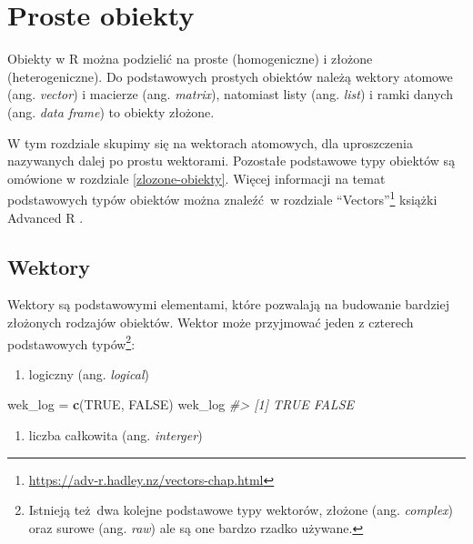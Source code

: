 \documentclass[paper=6in:9in,pagesize=pdftex,headinclude=on,footinclude=on,10pt]{scrbook}
\newenvironment{Shaded}{\begin{snugshade}}{\end{snugshade}}
\newcommand{\CommentTok}[1]{\textcolor[rgb]{0.56,0.35,0.01}{\textit{#1}}}
\newcommand{\KeywordTok}[1]{\textcolor[rgb]{0.13,0.29,0.53}{\textbf{#1}}}
\newcommand{\NormalTok}[1]{#1}
\newcommand{\OtherTok}[1]{\textcolor[rgb]{0.56,0.35,0.01}{#1}}
\newcommand{\StringTok}[1]{\textcolor[rgb]{0.31,0.60,0.02}{#1}}
\DeclareRobustCommand{\href}[2]{#2\footnote{\url{#1}}}
\providecommand{\tightlist}{%
  \setlength{\itemsep}{0pt}\setlength{\parskip}{0pt}}
\begin{document}
\hypertarget{proste-obiekty}{%
\chapter{Proste obiekty}\label{proste-obiekty}}

Obiekty w R można podzielić na proste (homogeniczne) i złożone (heterogeniczne).
Do podstawowych prostych obiektów należą wektory atomowe (ang. \emph{vector}) i macierze (ang. \emph{matrix}), natomiast listy (ang. \emph{list}) i ramki danych (ang. \emph{data frame}) to obiekty złożone.

W tym rozdziale skupimy się na wektorach atomowych, dla uproszczenia nazywanych dalej po prostu wektorami.
Pozostałe podstawowe typy obiektów są omówione w rozdziale \ref{zlozone-obiekty}.
Więcej informacji na temat podstawowych typów obiektów można znaleźć~w rozdziale \href{https://adv-r.hadley.nz/vectors-chap.html}{``Vectors''} książki Advanced R \citep{wickham2014advanced}.

\hypertarget{wektory}{%
\section{Wektory}\label{wektory}}

Wektory są podstawowymi elementami, które pozwalają na budowanie bardziej złożonych rodzajów obiektów.
Wektor może przyjmować jeden z czterech podstawowych typów\footnote{Istnieją też~dwa kolejne podstawowe typy wektorów, złożone (ang. \emph{complex}) oraz surowe (ang. \emph{raw}) ale są one bardzo rzadko używane.}:

\begin{enumerate}
\def\labelenumi{\arabic{enumi}.}
\tightlist
\item
  logiczny (ang. \emph{logical})
\end{enumerate}

\begin{Shaded}
\begin{Highlighting}[]
\NormalTok{wek_log =}\StringTok{ }\KeywordTok{c}\NormalTok{(}\OtherTok{TRUE}\NormalTok{, }\OtherTok{FALSE}\NormalTok{)}
\NormalTok{wek_log}
\CommentTok{#> [1]  TRUE FALSE}
\end{Highlighting}
\end{Shaded}

\begin{enumerate}
\def\labelenumi{\arabic{enumi}.}
\setcounter{enumi}{1}
\tightlist
\item
  liczba całkowita (ang. \emph{interger})
\end{enumerate}
\end{document}

